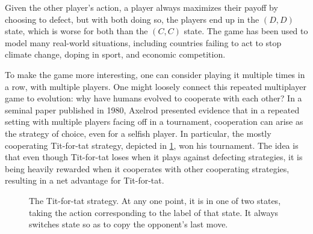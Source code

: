 \documentclass[12pt]{article}
\theoremstyle{definition}
\theoremstyle{remark}
\begin{document}
Given the other player's action, a player always maximizes their payoff by choosing to defect, but with both doing so, the players end up in the $(D, D)$ state, which is worse for both than the $(C, C)$ state. The game has been used to model many real-world situations, including countries failing to act to stop climate change, doping in sport, and economic competition.

To make the game more interesting, one can consider playing it multiple times in a row, with multiple players. One might loosely connect this repeated multiplayer game to evolution: why have humans evolved to cooperate with each other? In a seminal paper published in 1980, Axelrod \cite{axelrod1980effective} presented evidence that in a repeated setting with multiple players facing off in a tournament, cooperation can arise as the strategy of choice, even for a selfish player. In particular, the mostly cooperating Tit-for-tat strategy, depicted in \cref{tftfigure}, won his tournament. The idea is that even though Tit-for-tat loses when it plays against defecting strategies, it is being heavily rewarded when it cooperates with other cooperating strategies, resulting in a net advantage for Tit-for-tat.

\begin{figure}
  \centering
  \caption{The Tit-for-tat strategy. At any one point, it is in one of two states, taking the action corresponding to the label of that state. It always switches state so as to copy the opponent's last move.}
  \label{tftfigure}
\end{figure}
\end{document}

